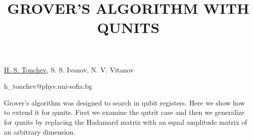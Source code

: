 \title{GROVER'S ALGORITHM WITH QUNITS}

\underline{H. S. Tonchev}, S. S. Ivanov, N. V. Vitanov

{\normalsize{

\vspace{-4mm} \unisofia

\email h\_tonchev@phys.uni-sofia.bg}}

Grover's algorithm was designed to search in qubit registers. Here we show how to extend it for qunits. First we examine the qutrit case and then we generalize for qunits by replacing the Hadamard matrix with an equal amplitude matrix of an arbitrary dimension.

\vspace{\baselineskip} 